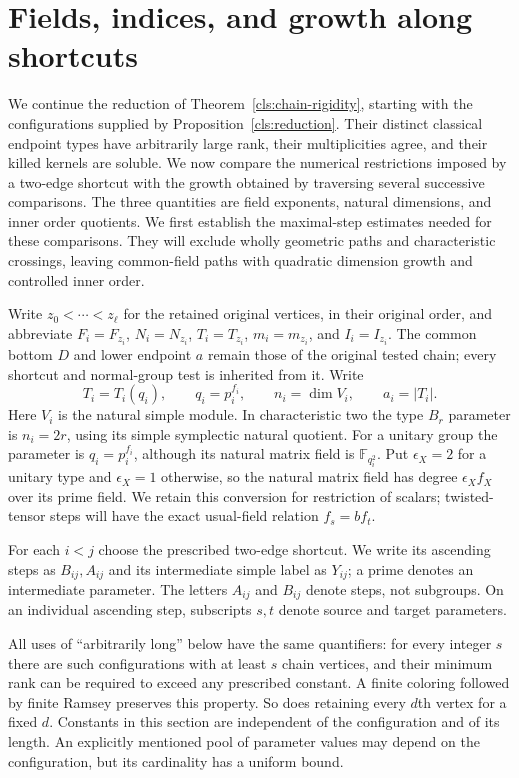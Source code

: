 \section{Fields, indices, and growth along shortcuts}
\label{grw:section}

We continue the reduction of Theorem~\ref{cls:chain-rigidity}, starting
with the configurations supplied by Proposition~\ref{cls:reduction}.
Their distinct classical endpoint types have arbitrarily large rank,
their multiplicities agree, and their killed kernels are soluble.
We now compare the numerical restrictions imposed by a two-edge shortcut
with the growth obtained by traversing several successive comparisons.
The three quantities are field exponents, natural dimensions, and inner
order quotients. We first establish the maximal-step estimates needed
for these comparisons. They will exclude wholly geometric paths and
characteristic crossings, leaving common-field paths with quadratic
dimension growth and controlled inner order.

Write $z_0<\cdots<z_\ell$ for the retained original vertices, in their
original order, and abbreviate $F_i=F_{z_i}$, $N_i=N_{z_i}$,
$T_i=T_{z_i}$, $m_i=m_{z_i}$, and $I_i=I_{z_i}$. The common
bottom $D$ and lower endpoint $a$ remain those of the original tested
chain; every shortcut and normal-group test is inherited from it.
Write
\[
 T_i=T_i(q_i),\qquad q_i=p_i^{f_i},\qquad n_i=\dim V_i,
 \qquad a_i=|T_i|.
\]
Here $V_i$ is the natural simple module. In characteristic two the
type $B_r$ parameter is $n_i=2r$, using its simple symplectic natural
quotient. For a unitary group the parameter is $q_i=p_i^{f_i}$,
although its natural matrix field is $\mathbb F_{q_i^2}$.
Put $\epsilon_X=2$ for a unitary type and $\epsilon_X=1$ otherwise,
so the natural matrix field has degree $\epsilon_Xf_X$ over its
prime field. We retain this conversion for restriction of scalars;
twisted-tensor steps will have the exact usual-field relation
$f_s=b f_t$.

For each $i<j$ choose the prescribed two-edge shortcut. We write its
ascending steps as $B_{ij},A_{ij}$ and its intermediate simple label as
$Y_{ij}$; a prime denotes an intermediate parameter. The letters $A_{ij}$
and $B_{ij}$ denote steps, not subgroups. On an individual ascending
step, subscripts $s,t$ denote source and target parameters.

All uses of ``arbitrarily long'' below have the same quantifiers: for
every integer $s$ there are such configurations with at least $s$ chain
vertices, and their minimum rank can be required to exceed any prescribed
constant. A finite coloring followed by finite Ramsey preserves this
property. So does retaining every $d$th vertex for a fixed $d$. Constants
in this section are independent of the configuration and of its length.
An explicitly mentioned pool of parameter values may depend on the
configuration, but its cardinality has a uniform bound.

